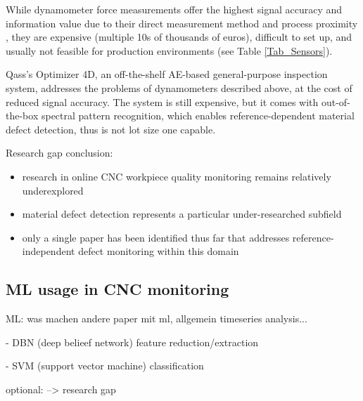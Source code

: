 \documentclass[5p,times,procedia]{elsarticle}
\newenvironment{note}{%
	\noindent
    \color{notecolor}%
}{%
    \par\medskip%
}
\begin{document}
While dynamometer force measurements offer the highest signal accuracy and information value due to their direct measurement method and process proximity \cite[]{Korkmaz.Yasar.ea2020}, they are expensive (multiple 10s of thousands of euros), difficult to set up, and usually not feasible for production environments (see Table \ref{Tab_Sensors}).

Qass's Optimizer 4D, an off-the-shelf AE-based general-purpose inspection system, addresses the problems of dynamometers described above, at the cost of reduced signal accuracy. The system is still expensive, but it comes with out-of-the-box spectral pattern recognition, which enables reference-dependent material defect detection, thus is not lot size one capable. \cite[p.5]{Szulewski.Sniegulska-Gradzka2017}

\vspace*{.5\baselineskip}
\noindent Research gap conclusion:\label{gap}
\vspace*{-\baselineskip}
\begin{itemize}
	\item research in online CNC workpiece quality monitoring remains relatively underexplored
	\item material defect detection represents a particular under-researched subfield
	\item only a single paper has been identified thus far that addresses reference-independent defect monitoring within this domain
\end{itemize}

\subsection{ML usage in CNC monitoring}
\vspace*{-\baselineskip}




\begin{note}
ML: was machen andere paper mit ml, allgemein timeseries analysis...

- DBN (deep belieef network) feature reduction/extraction

- SVM (support vector machine) classification

optional: --> research gap
\end{note}








\end{document}
